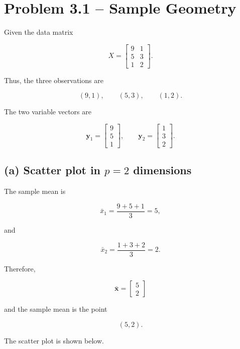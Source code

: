 \documentclass{article}
\begin{document}

\section*{Problem 3.1 -- Sample Geometry}

Given the data matrix

\[
X=
\begin{bmatrix}
9&1\\
5&3\\
1&2
\end{bmatrix}.
\]

Thus, the three observations are

\[
(9,1),\qquad (5,3),\qquad (1,2).
\]

The two variable vectors are

\[
\mathbf y_1=
\begin{bmatrix}
9\\5\\1
\end{bmatrix},
\qquad
\mathbf y_2=
\begin{bmatrix}
1\\3\\2
\end{bmatrix}.
\]


\subsection*{(a) Scatter plot in \(p=2\) dimensions}

The sample mean is

\[
\bar{x}_1
=
\frac{9+5+1}{3}
=5,
\]

and

\[
\bar{x}_2
=
\frac{1+3+2}{3}
=2.
\]

Therefore,

\[
\boxed{
\bar{\mathbf{x}}
=
\begin{bmatrix}
5\\
2
\end{bmatrix}}
\]

and the sample mean is the point

\[
\boxed{(5,2)}.
\]

The scatter plot is shown below.
\end{document}
